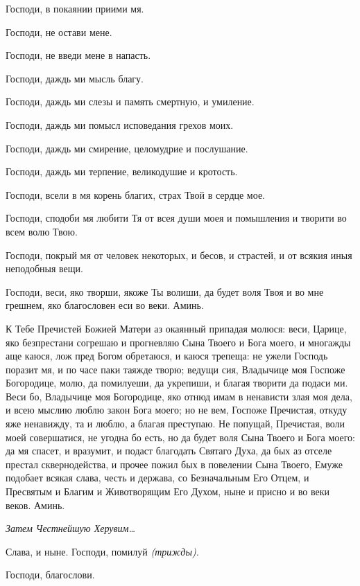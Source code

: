 Господи, в покаянии приими мя.

Господи, не остави мене.

Господи, не введи мене в напасть.

Господи, даждь ми мысль благу.

Господи, даждь ми слезы и память смертную, и умиление.

Господи, даждь ми помысл исповедания грехов моих.

Господи, даждь ми смирение, целомудрие и послушание.

Господи, даждь ми терпение, великодушие и кротость.

Господи, всели в мя корень благих, страх Твой в сердце мое.

Господи, сподоби мя любити Тя от всея души моея и помышления и творити во всем волю Твою.

Господи, покрый мя от человек некоторых, и бесов, и страстей, и от всякия иныя неподобныя вещи.

Господи, веси, яко творши, якоже Ты волиши, да будет воля Твоя и во мне грешнем, яко благословен еси во веки. Аминь.



К Тебе Пречистей Божией Матери аз окаянный припадая молюся: веси, Царице, яко безпрестани согрешаю и прогневляю Сына Твоего и Бога моего, и многажды аще каюся, лож пред Богом обретаюся, и каюся трепеща: не ужели Господь поразит мя, и по часе паки таяжде творю; ведущи сия, Владычице моя Госпоже Богородице, молю, да помилуеши, да укрепиши, и благая творити да подаси ми. Веси бо, Владычице моя Богородице, яко отнюд имам в ненависти злая моя дела, и всею мыслию люблю закон Бога моего; но не вем, Госпоже Пречистая, откуду яже ненавижду, та и люблю, а благая преступаю. Не попущай, Пречистая, воли моей совершатися, не угодна бо есть, но да будет воля Сына Твоего и Бога моего: да мя спасет, и вразумит, и подаст благодать Святаго Духа, да бых аз отселе престал сквернодейства, и прочее пожил бых в повелении Сына Твоего, Емуже подобает всякая слава, честь и держава, со Безначальным Его Отцем, и Пресвятым и Благим и Животворящим Его Духом, ныне и присно и во веки веков. Аминь.


\itshape Затем \normalfont{}Честнейшую Херувим… 

Слава, и ныне. Господи, помилуй \itshape (трижды)\normalfont{}. 

Господи, благослови. 




